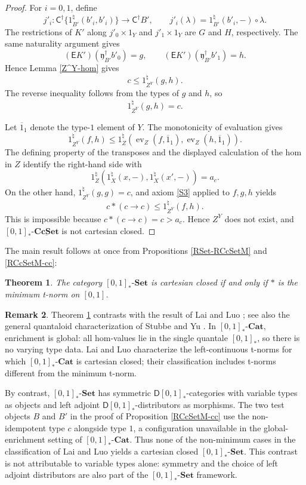 \documentclass{birkau}
\theoremstyle{plain}
\newtheorem{thm}{Theorem}[section]
\theoremstyle{definition}
\newtheorem{rem}[thm]{Remark}
\DeclareMathOperator{\ev}{ev}
\newcommand{\ra}{\rightarrow}
\newcommand{\nat}{\natural}
\newcommand{\lam}{\lambda}
\newcommand{\sC}{\mathsf{C}}
\newcommand{\sD}{\mathsf{D}}
\newcommand{\sE}{\mathsf{E}}
\newcommand{\Fy}{\mathfrak{y}}
\newcommand{\Cat}{\mathbf{Cat}}
\newcommand{\Set}{\mathbf{Set}}
\newcommand{\CcSet}{\mathbf{CcSet}}
\newcommand{\RSet}{[0,1]_*\text{-}\Set}
\newcommand{\RCcSetM}{[0,1]_*\text{-}\underline{\CcSet}}
\newcommand{\sCd}{\sC^{\dag}}
\newcommand{\Fyd}{\Fy^{\dag}}
\renewcommand{\leq}{\leqslant}
\numberwithin{equation}{section}
\begin{document}
\begin{proof}
For $i=0,1$, define
\[
j'_i\colon\sCd\{1_{B'}^{\nat}(b'_i,b'_i)\}\to\sCd B',\qquad
j'_i(\lam)=1_{B'}^{\nat}(b'_i,-)\circ\lam.
\]
The restrictions of $K'$ along $j'_0\times1_Y$ and $j'_1\times1_Y$ are $G$ and $H$, respectively. The same naturality argument gives
\[
(\sE K')(\Fyd_{B'} b'_0)=g,\qquad (\sE K')(\Fyd_{B'} b'_1)=h.
\]
Hence Lemma \ref{Z^Y-hom} gives
\[
c\leq1_{Z^Y}^{\nat}(g,h).
\]
The reverse inequality follows from the types of $g$ and $h$, so
\[
1_{Z^Y}^{\nat}(g,h)=c.
\]

Let $\overline{1}_1$ denote the type-$1$ element of $Y$. The monotonicity of evaluation gives
\[
1_{Z^Y}^{\nat}(f,h)\leq1_Z^{\nat}\left(\ev_Z(f,\overline{1}_1),\ev_Z(h,\overline{1}_1)\right).
\]
The defining property of the transposes and the displayed calculation of the hom in $Z$ identify the right-hand side with
\[
1_Z^{\nat}\left(1_X^{\nat}(x,-),1_X^{\nat}(x',-)\right)=a_c.
\]
On the other hand, $1_{Z^Y}^{\nat}(g,g)=c$, and axiom \ref{S3} applied to $f,g,h$ yields
\[
c*(c\ra c)\leq1_{Z^Y}^{\nat}(f,h).
\]
This is impossible because $c*(c\ra c)=c>a_c$. Hence $Z^Y$ does not exist, and $\RCcSetM$ is not cartesian closed.
\end{proof}

The main result follows at once from Propositions \ref{RSet-RCcSetM} and \ref{RCcSetM-cc}:

\begin{thm} \label{QSet-topos-frame}
The category $\RSet$ is cartesian closed if and only if $*$ is the minimum t-norm on $[0,1]$.
\end{thm}

\begin{rem}

Theorem \ref{QSet-topos-frame} contrasts with the result of Lai and Luo \cite{Lai2026a}; see also the general quantaloid characterization of Stubbe and Yu \cite{Stubbe2026}. In $[0,1]_*\text{-}\Cat$, enrichment is global: all hom-values lie in the single quantale $[0,1]_*$, so there is no varying type data. Lai and Luo characterize the left-continuous t-norms for which $[0,1]_*\text{-}\Cat$ is cartesian closed; their classification includes t-norms different from the minimum t-norm.

By contrast, $\RSet$ has symmetric $\sD[0,1]_*$-categories with variable types as objects and left adjoint $\sD[0,1]_*$-distributors as morphisms. The two test objects $B$ and $B'$ in the proof of Proposition \ref{RCcSetM-cc} use the non-idempotent type $c$ alongside type $1$, a configuration unavailable in the global-enrichment setting of $[0,1]_*\text{-}\Cat$. Thus none of the non-minimum cases in the classification of Lai and Luo yields a cartesian closed $\RSet$. This contrast is not attributable to variable types alone: symmetry and the choice of left adjoint distributors are also part of the $\RSet$ framework.
\end{rem}
\end{document}
